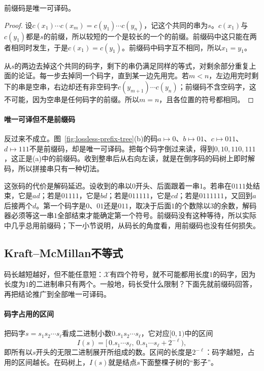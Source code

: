 \begin{theorem}[前缀码唯一可译]
\label{thm:lossless-prefix-ud}
前缀码是唯一可译码。
\end{theorem}

\begin{proof}
设$c(x_1)\cdots c(x_m)=c(y_1)\cdots c(y_n)$，记这个共同的串为$s$。$c(x_1)$与$c(y_1)$都是$s$的前缀，所以较短的一个是较长的一个的前缀。前缀码中这只能在两者相同时发生，于是$c(x_1)=c(y_1)$。前缀码中码字互不相同，所以$x_1=y_1$。

从$s$的两边去掉这个共同的码字，剩下的串仍满足同样的等式，对剩余部分重复上面的论证。每一步去掉同一个码字，直到某一边先用完。若$m<n$，左边用完时剩下的串是空串，右边却还有非空码字$c(y_{m+1})\cdots c(y_n)$；前缀码不含空码字，这不可能，因为空串是任何码字的前缀。所以$m=n$，且各位置的符号都相同。
\end{proof}

\paragraph{唯一可译但不是前缀码}
反过来不成立。图~\ref{fig:lossless-prefix-tree}(b)的码$a\mapsto0$、$b\mapsto01$、$c\mapsto011$、$d\mapsto111$不是前缀码，却是唯一可译码。把每个码字倒过来读，得到$0,10,110,111$，这正是(a)中的前缀码。收到整串后从右向左读，就是在倒序码的码树上即时解码，所以拼接串只有一种切法。

这张码的代价是解码延迟。设收到的串以$0$开头、后面跟着一串$1$。若串在$0111$处结束，它是$ad$；若是$01111$，它是$bd$；若是$011111$，它是$cd$；若是$0111111$，又回到$a$后接两个$d$。第一个码字是$0$、$01$还是$011$，取决于后面$1$的个数除以$3$的余数，解码器必须等这一串$1$全部结束才能确定第一个符号。前缀码没有这种等待，所以实际中几乎总用前缀码；下一小节说明，从码长的角度看，用前缀码也没有任何损失。

\subsection{Kraft–McMillan不等式}
\label{sec:lossless-kraft}

码长越短越好，但不能任意短：$\mathcal{X}$有四个符号，就不可能都用长度$1$的码字，因为长度为$1$的二进制串只有两个。一般地，码长受什么限制？下面先就前缀码回答，再把结论推广到全部唯一可译码。

\paragraph{码字占用的区间}
把码字$s=s_1s_2\cdots s_\ell$看成二进制小数$0.s_1s_2\cdots s_\ell$，它对应$[0,1)$中的区间
\[
 I(s)=\bigl[\,0.s_1\cdots s_\ell,\ 0.s_1\cdots s_\ell+2^{-\ell}\bigr),
\]
即所有以$s$开头的无限二进制展开所组成的数。区间的长度是$2^{-\ell}$：码字越短，占用的区间越长。在码树上，$I(s)$就是结点$s$下面整棵子树的“影子”。


